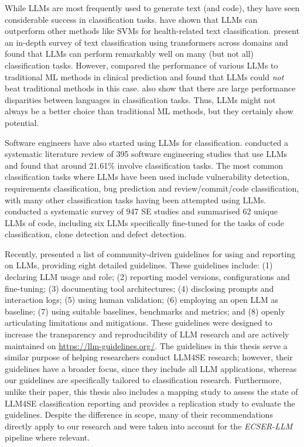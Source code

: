 \documentclass[a4paper]{article}
\newcommand{\newecser}{\textit{ECSER-LLM} }
\begin{document}
While LLMs are most frequently used to generate text (and code), they have seen considerable success in classification tasks. \textcite{Guo2024health} have shown that LLMs can outperform other methods like SVMs for health-related text classification. \textcite{fields2024} present an in-depth survey of text classification using transformers across domains and found that LLMs can perform remarkably well on many (but not all) classification tasks. However, \textcite{Chen2024} compared the performance of various LLMs to traditional ML methods in clinical prediction and found that LLMs could \textit{not} beat traditional methods in this case. \textcite{vajjala2025} also show that there are large performance disparities between languages in classification tasks. Thus, LLMs might not always be a better choice than traditional ML methods, but they certainly show potential. 

Software engineers have also started using LLMs for classification. \textcite{hou2024} conducted a systematic literature review of 395 software engineering studies that use LLMs and found that around 21.61\% involve classification tasks. The most common classification tasks where LLMs have been used include vulnerability detection, requirements classification, bug prediction and review/commit/code classification, with many other classification tasks having been attempted using LLMs. \textcite{zhang2024} conducted a systematic survey of 947 SE studies and summarised 62 unique LLMs of code, including six LLMs specifically fine-tuned for the tasks of code classification, clone detection and defect detection.

Recently, \textcite{baltes2025guidelinesempiricalstudiessoftware} presented a list of community-driven guidelines for using and reporting on LLMs, providing eight detailed guidelines. These guidelines include: (1) declaring LLM usage and role; (2) reporting model versions, configurations and fine-tuning; (3) documenting tool architectures; (4) disclosing prompts and interaction logs; (5) using human validation; (6) employing an open LLM as baseline; (7) using suitable baselines, benchmarks and metrics; and (8) openly articulating limitations and mitigations. These guidelines were designed to increase the transparency and reproducibility of LLM research and are actively maintained on \url{https://llm-guidelines.org/}. The guidelines in this thesis serve a similar purpose of helping researchers conduct LLM4SE research; however, their guidelines have a broader focus, since they include all LLM applications, whereas our guidelines are specifically tailored to classification research. Furthermore, unlike their paper, this thesis also includes a mapping study to assess the state of LLM4SE classification reporting and provides a replication study to evaluate the guidelines. Despite the difference in scope, many of their recommendations directly apply to our research and were taken into account for the \newecser pipeline where relevant.
\end{document}
